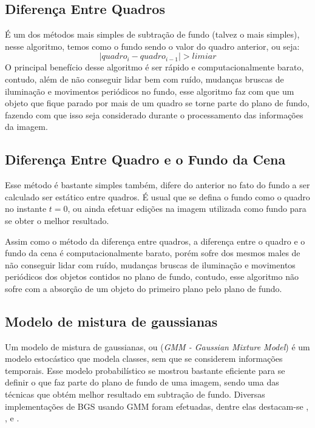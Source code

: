 \documentclass[ecp,tc]{iiufrgs}
\begin{document}
\subsection{Diferença Entre Quadros}

É um dos métodos mais simples de subtração de fundo (talvez o mais simples), nesse algoritmo, temos como o fundo sendo o valor do quadro anterior, ou seja:
\[|quadro_i - quadro_{i-1} | > limiar \]
O principal benefício desse algoritmo é ser rápido e computacionalmente barato, contudo, além de não conseguir lidar bem com ruído, mudanças bruscas de iluminação e movimentos periódicos no fundo, esse algoritmo faz com que um objeto que fique parado por mais de um quadro se torne parte do plano de fundo, fazendo com que isso seja considerado durante o processamento das informações da imagem.

\subsection{Diferença Entre Quadro e o Fundo da Cena}
Esse método é bastante simples também, difere do anterior no fato do fundo a ser calculado ser estático entre quadros. É usual que se defina o fundo como o quadro no instante $ t = 0 $, ou ainda efetuar edições na imagem utilizada como fundo para se obter o melhor resultado.

Assim como o método da diferença entre quadros, a diferença entre o quadro e o fundo da cena é computacionalmente barato, porém sofre dos mesmos males de não
conseguir lidar com ruído, mudanças bruscas de iluminação e movimentos periódicos dos objetos contidos no plano de fundo, contudo, esse algoritmo não sofre com a absorção de um objeto do primeiro plano pelo plano de fundo.

\subsection{Modelo de mistura de gaussianas}

Um modelo de mistura de gaussianas, ou (\textit{GMM - Gaussian Mixture Model}) é um modelo estocástico que modela classes, sem que se considerem informações temporais. Esse modelo probabilístico se mostrou bastante eficiente para se definir o que faz parte do plano de fundo de uma imagem, sendo uma das técnicas que obtém melhor resultado em subtração de fundo. Diversas implementações de BGS usando GMM foram efetuadas, dentre elas destacam-se , ,  e .
\end{document}
